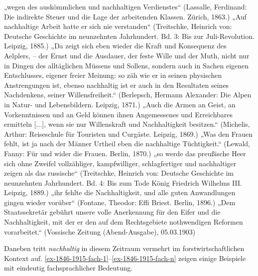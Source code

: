 \documentclass[
    german,
    a4paper,%
    12pt,%
    oneside,%
    toc=bibliography,
    final,
]{scrartcl}
\begin{document}
\begin{exe}
\ex \label{ex-1846-1915-permanent-1} „wegen des auskömmlichen und nachhaltigen Verdienstes“ (Lassalle, Ferdinand: Die indirekte Steuer und die Lage der arbeitenden Klassen. Zürich, 1863.)
\ex \label{ex-1846-1915-permanent-2} „Auf nachhaltige Arbeit hatte er sich nie verstanden“ (Treitschke, Heinrich von: Deutsche Geschichte im neunzehnten Jahrhundert. Bd. 3: Bis zur Juli-Revolution. Leipzig, 1885.)
\ex \label{ex-1846-1915-ausdauernd-1} „Da zeigt sich eben wieder die Kraft und Konsequenz des Aelplers, -- der Ernst und die Ausdauer, der feste Wille und der Muth, nicht nur in Dingen des alltäglichen Müssens und Sollens, sondern auch in Sachen eigenen Entschlusses, eigener freier Meinung: so zäh wie er in seinen physischen Anstrengungen ist, ebenso nachhaltig ist er auch in den Resultaten seines Nachdenkens, seiner Willensfreiheit.“ (Berlepsch, Hermann Alexander: Die Alpen in Natur- und Lebensbildern. Leipzig, 1871.)
\ex „Auch die Armen an Geist, an Vorkenntnissen und an Geld können ihnen Angemessenes und Erreichbares ermitteln [...], wenn sie nur Willenskraft und Nachhaltigkeit besitzen.“ (Michelis, Arthur: Reiseschule für Touristen und Curgäste. Leipzig, 1869.)
\ex „Was den Frauen fehlt, ist ja nach der Männer Urtheil eben die nachhaltige Tüchtigkeit.“ (Lewald, Fanny: Für und wider die Frauen. Berlin, 1870.)
\ex „so werde das preußische Heer sich ohne Zweifel vollzähliger, kampfwilliger, schlagfertiger und nachhaltiger zeigen als das russische“ (Treitschke, Heinrich von: Deutsche Geschichte im neunzehnten Jahrhundert. Bd. 4: Bis zum Tode König Friedrich Wilhelms III. Leipzig, 1889.)
\ex „ihr fehlte die Nachhaltigkeit, und alle guten Anwandlungen gingen wieder vorüber“ (Fontane, Theodor: Effi Briest. Berlin, 1896.)
\ex \label{ex-1846-1915-ausdauernd-n} „Dem Staatssekretär gebührt unsere volle Anerkennung für den Eifer und die Nachhaltigkeit, mit der er den auf dem Rechtsgebiete nothwendigen Reformen vorarbeitet.“ (Vossische Zeitung (Abend-Ausgabe), 05.03.1903)
\end{exe}

Daneben tritt \textit{nachhaltig} in diesem Zeitraum vermehrt im forstwirtschaftlichen Kontext auf. \ref{ex-1846-1915-fach-1}–\ref{ex-1846-1915-fach-n} zeigen einige Beispiele mit eindeutig fachsprachlicher Bedeutung.
\end{document}
